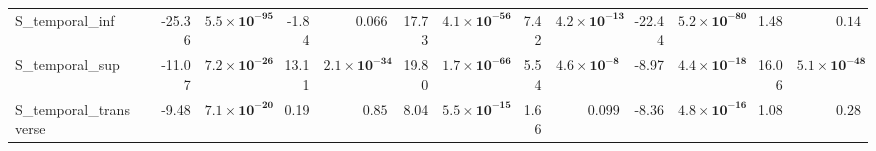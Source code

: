 {\begin{longtable}{llrrrrrrrrrrrr}
S\_temporal\_inf &  & -25.36 & $\mathbf{5.5{\times}10^{-95}}$ & -1.84 & $0.066$ & 17.73 & $\mathbf{4.1{\times}10^{-56}}$ & 7.42 & $\mathbf{4.2{\times}10^{-13}}$ & -22.44 & $\mathbf{5.2{\times}10^{-80}}$ & 1.48 & $0.14$ \\
S\_temporal\_sup &  & -11.07 & $\mathbf{7.2{\times}10^{-26}}$ & 13.11 & $\mathbf{2.1{\times}10^{-34}}$ & 19.80 & $\mathbf{1.7{\times}10^{-66}}$ & 5.54 & $\mathbf{4.6{\times}10^{-8}}$ & -8.97 & $\mathbf{4.4{\times}10^{-18}}$ & 16.06 & $\mathbf{5.1{\times}10^{-48}}$ \\
S\_temporal\_transverse &  & -9.48 & $\mathbf{7.1{\times}10^{-20}}$ & 0.19 & $0.85$ & 8.04 & $\mathbf{5.5{\times}10^{-15}}$ & 1.66 & $0.099$ & -8.36 & $\mathbf{4.8{\times}10^{-16}}$ & 1.08 & $0.28$ \\
\end{longtable}}

